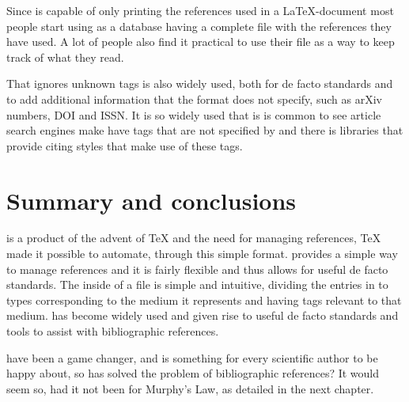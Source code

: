 Since {\bibtex} is capable of only printing the references used in a
{\LaTeX}-document most people start using {\bibtex} as a database
having a complete file with the references they have used.  A lot of
people also find it practical to use their {\bibtex} file as a way to
keep track of what they read.

That {\bibtex} ignores unknown tags is also widely used, both for de
facto standards and to add additional information that the format does
not specify, such as arXiv numbers, DOI and ISSN.  It is so widely
used that is is common to see article search engines make have tags
that are not specified by {\bibtex} and there is libraries that
provide citing styles that make use of these tags.


\section{Summary and conclusions}
\label{sec:about_conclusion}

{\bibtex} is a product of the advent of {\TeX} and the
need for managing references, {\TeX} made it possible to automate,
through this simple format.  {\bibtex} provides a simple way to manage
references and it is fairly flexible and thus allows for useful de
facto standards.  The inside of a {\bibtex} file is simple and
intuitive, dividing the entries in to types corresponding to the
medium it represents and having tags relevant to that medium.
{\bibtex} has become widely used and given rise to useful de facto
standards and tools to assist with bibliographic references.

{\bibtex} have been a game changer, and is something for every
scientific author to be happy about, so has {\bibtex} solved the
problem of bibliographic references? It would seem so, had it not been
for Murphy's Law, as detailed in the next chapter.


%
%
